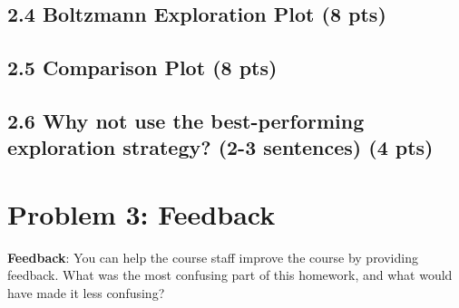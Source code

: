 \documentclass[12pt]{article}
\begin{document}
\subsection*{2.4 Boltzmann Exploration Plot (8 pts)}
\begin{tcolorbox}[fit,height=22em, width=40em, blank, borderline={1pt}{1pt},nobeforeafter]
    \begin{center}
    \end{center}
    \end{tcolorbox}

\subsection*{2.5 Comparison Plot (8 pts)}
\begin{tcolorbox}[fit,height=22em, width=40em, blank, borderline={1pt}{1pt},nobeforeafter]
            \begin{center}
            \end{center}
            \end{tcolorbox}

\subsection*{2.6 Why not use the best-performing exploration strategy? (2-3 sentences) (4 pts)}
\begin{tcolorbox}[fit,height=22em, width=40em, blank, borderline={1pt}{1pt},nobeforeafter]
            \begin{center}
            \end{center}
            \end{tcolorbox}


\section*{Problem 3: Feedback}

\textbf{Feedback}: You can help the course staff improve the course by providing feedback. What was the most confusing part of this homework, and what would have made it less confusing?

\begin{tcolorbox}[fit,height=10em, width=40em, blank, borderline={1pt}{1pt},nobeforeafter]
            \begin{center}
            \end{center}
            \end{tcolorbox}\\
\end{document}

